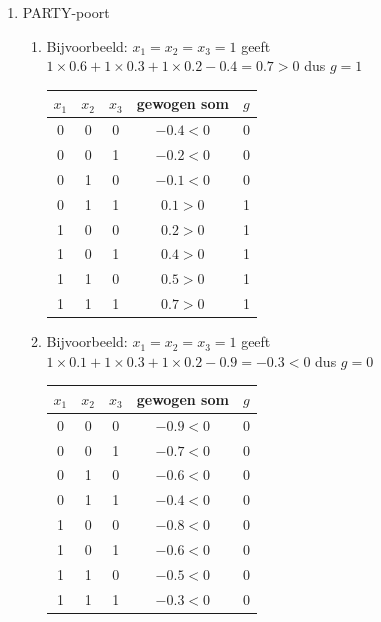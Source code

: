 \begin{enumerate}[label=3.\arabic*, itemsep=8pt]
	\item PARTY-poort
	\begin{enumerate}[itemsep=8pt]
		\item Bijvoorbeeld: $x_1 = x_2 = x_3 = 1$ geeft \\ $1 \times 0.6 + 1 \times 0.3 + 1 \times 0.2 - 0.4 = 0.7 > 0$ dus $g = 1$

		\begin{tabular}{c|c|c|c|c}
		      $x_1$ 			& $x_2$ 			& $x_3$			& gewogen som			& $g$	\\
		      \hline
		      0				& 0				& 0 				& $-0.4 < 0$			& 0		\\
		      0				& 0				& 1 				& $-0.2 < 0$			& 0		\\
		      0				& 1				& 0 				& $-0.1 < 0$			& 0		\\
		      0				& 1				& 1 				& $0.1 > 0$			& 1		\\
		      1				& 0				& 0 				& $0.2 > 0$			& 1		\\
		      1				& 0				& 1 				& $0.4 > 0$			& 1		\\
		      1				& 1				& 0 				& $0.5 > 0$			& 1		\\
		      1				& 1				& 1 				& $0.7 > 0$			& 1		\\
	    \end{tabular}

	    	\item Bijvoorbeeld: $x_1 = x_2 = x_3 = 1$ geeft \\ $1 \times 0.1 + 1 \times 0.3 + 1 \times 0.2 - 0.9 = -0.3 < 0$ dus $g = 0$

		\begin{tabular}{c|c|c|c|c}
		      $x_1$ 			& $x_2$ 			& $x_3$			& gewogen som			& $g$	\\
		      \hline
		      0				& 0				& 0 				& $-0.9 < 0$			& 0		\\
		      0				& 0				& 1 				& $-0.7 < 0$			& 0		\\
		      0				& 1				& 0 				& $-0.6 < 0$			& 0		\\
		      0				& 1				& 1 				& $-0.4 < 0$			& 0		\\
		      1				& 0				& 0 				& $-0.8 < 0$			& 0		\\
		      1				& 0				& 1 				& $-0.6 < 0$			& 0		\\
		      1				& 1				& 0 				& $-0.5 < 0$			& 0		\\
		      1				& 1				& 1 				& $-0.3 < 0$			& 0		\\
	    \end{tabular}
    	\end{enumerate}



\end{enumerate}
